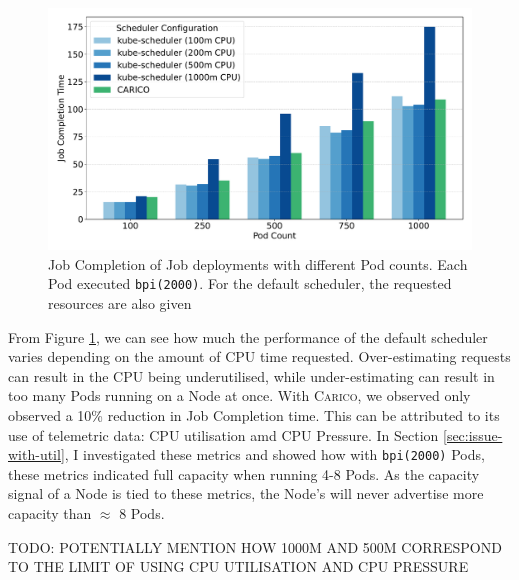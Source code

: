 \begin{figure}[ht!]
    \centering
    \includegraphics[width=\textwidth]{images/pi-job-completion.pdf}
    \caption{Job Completion of Job deployments with different Pod counts. Each
    Pod executed \texttt{bpi(2000)}. For the default scheduler, the requested
    resources are also given}
    \label{tab:pi-2000-throughput}
\end{figure}

From Figure \ref{tab:pi-2000-throughput}, we can see how much the performance of
the default scheduler varies depending on the amount of CPU time requested.
Over-estimating requests can result in the CPU being underutilised, while
under-estimating can result in too many Pods running on a Node at once. With
\textsc{Carico}, we observed only observed a 10\% reduction in Job Completion time. This
can be attributed to its use of telemetric data: CPU utilisation amd CPU
Pressure. In Section \ref{sec:issue-with-util}, I investigated these metrics and
showed how with \texttt{bpi(2000)} Pods, these metrics indicated full capacity
when running 4-8 Pods. As the capacity signal of a Node is tied to these
metrics, the Node's will never advertise more capacity than $\approx$ 8 Pods.

TODO: POTENTIALLY MENTION HOW 1000M AND 500M CORRESPOND TO THE LIMIT OF USING
CPU UTILISATION AND CPU PRESSURE

